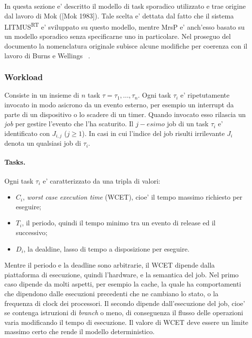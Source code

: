 In questa sezione e' descritto il modello di task sporadico utilizzato e trae origine dal lavoro di Mok ([Mok 1983]). Tale scelta e' dettata dal fatto che il sistema LITMUS\textsuperscript{RT} e' sviluppato su questo modello, mentre MrsP e' anch'esso basato su un modello sporadico senza specificarne uno in particolare. Nel proseguo del documento la nomenclatura originale subisce alcune modifiche per coerenza con il lavoro di Burns e Wellings ~\cite{Burns:2013:SCM:2547348.2547350}.

\subsubsection{Workload}
\label{sec:overviewWL}

Consiste in un insieme di $n$ task $\tau = {\tau_1, ... , \tau_n}$. Ogni task $\tau_i$ e' ripetutamente invocato in modo asicrono da un evento esterno, per esempio un interrupt da parte di un dispositivo o lo scadere di un timer. Quando invocato esso rilascia un \textit{job} per gestire l'evento che l'ha scaturito. Il $j-esimo$ job di un task $\tau_i$ e' identificato con $J_{i,j}$ ($j \geq 1$). In casi in cui l'indice del job risulti irrilevante $J_i$ denota un qualsiasi job di $\tau_i$.\\

\paragraph{Tasks.} Ogni task $\tau_i$ e' caratterizzato da una tripla di valori:\\
\begin{itemize}
	\item $C_i$, \textit{worst case execution time} (WCET), cioe' il tempo massimo richiesto per eseguire;
	\item $T_i$, il periodo, quindi il tempo minimo tra un evento di release ed il successivo;
	\item $D_i$, la dealdine, lasso di tempo a disposizione per eseguire.\\
\end{itemize}

Mentre il periodo e la deadline sono arbitrarie, il WCET dipende dalla piattaforma di esecuzione, quindi l'hardware, e la semantica del job. Nel primo caso dipende da molti aspetti, per esempio la cache, la quale ha comportamenti che dipendono dalle esecuzioni precedenti che ne cambiano lo stato, o la frequenza di clock dei processori. Il secondo dipende dall'esecuzione del job, cioe' se contenga istruzioni di \textit{branch} o meno, di conseguenza il flusso delle operazioni varia modificando il tempo di esecuzione. Il valore di WCET deve essere un limite massimo certo che rende il modello deterministico.\\

